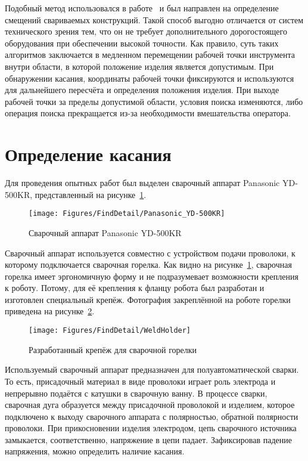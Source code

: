 Подобный метод использовался в работе~\cite{Fei_Gao_2015} и был направлен на определение смещений свариваемых конструкций.
Такой способ выгодно отличается от систем технического зрения тем, что он не требует дополнительного дорогостоящего оборудования при обеспечении высокой точности.
Как правило, суть таких алгоритмов заключается в медленном перемещении рабочей точки инструмента внутри области, в которой положение изделия является допустимым.
При обнаружении касания, координаты рабочей точки фиксируются и используются для дальнейшего пересчёта и определения положения изделия.
При выходе рабочей точки за пределы допустимой области, условия поиска изменяются, либо операция поиска прекращается из-за необходимости вмешательства оператора.


\section{Определение касания}
Для проведения опытных работ был выделен сварочный аппарат Panasonic YD-500KR, представленный на рисунке~\ref{fig:Find Touch:Panasonic YD-500KR}.

\begin{figure}[H]
    \centering
    \vspace{14pt}
    \texttt{[image: Figures/FindDetail/Panasonic\_YD-500KR]}
    \caption{Сварочный аппарат Panasonic YD-500KR}
    \label{fig:Find Touch:Panasonic YD-500KR}
\end{figure}

Сварочный аппарат используется совместно с устройством подачи проволоки, к которому подключается сварочная горелка.
Как видно на рисунке~\ref{fig:Find Touch:Panasonic YD-500KR}, сварочная горелка имеет эргономичную форму и не подразумевает возможности крепления к роботу.
Потому, для её крепления к фланцу робота был разработан и изготовлен специальный крепёж.
Фотография закреплённой на роботе горелки приведена на рисунке~\ref{fig:Find Touch:Weld Holder}.

\begin{figure}[H]
    \centering
    \vspace{14pt}
    \texttt{[image: Figures/FindDetail/WeldHolder]}
    \caption{Разработанный крепёж для сварочной горелки}
    \label{fig:Find Touch:Weld Holder}
\end{figure}

Используемый сварочный аппарат предназначен для полуавтоматической сварки.
То есть, присадочный материал в виде проволоки играет роль электрода и непрерывно подаётся с катушки в сварочную ванну.
В процессе сварки, сварочная дуга образуется между присадочной проволокой и изделием, которое подключено к выходу сварочного аппарата с полярностью, обратной полярности проволоки.
При прикосновении изделия электродом, цепь сварочного источника замыкается, соответственно, напряжение в цепи падает.
Зафиксировав падение напряжения, можно определить наличие касания.


